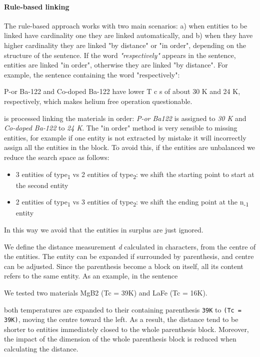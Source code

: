\documentclass{article}
\begin{document}
\paragraph{Rule-based linking}
The rule-based approach works with two main scenarios: a) when entities to be linked have cardinality one they are linked automatically, and b) when they have higher cardinality they are linked "by distance" or "in order", depending on the structure of the sentence. 
If the word \textit{"respectively"} appears in the sentence, entities are linked "in order", otherwise they are linked "by distance". 
For example, the sentence containing the word "respectively":  
\begin{displayquote}
P-or Ba-122  and Co-doped Ba-122 have lower T c s of about 30 K and 24 K, respectively, which makes helium free operation questionable.
\end{displayquote}
is processed linking the materials in order: \textit{P-or Ba122} is assigned to \textit{30 K} and \textit{Co-doped Ba-122} to \textit{24 K}.
The "in order" method is very sensible to missing entities, for example if one entity is not extracted by mistake it will incorrectly assign all the entities in the block. To avoid this, if the entities are unbalanced we reduce the search space as follows: 
\begin{itemize}
    \item 3 entities of type\textsubscript{1} vs 2 entities of type\textsubscript{2}: we shift the starting point to start at the second entity 
    \item 2 entities of type\textsubscript{1} vs 3 entities of type\textsubscript{2}: we shift the ending point at the n\textsubscript{-1} entity
\end{itemize}
In this way we avoid that the entities in surplus are just ignored. 

We define the distance measurement \textit{d} calculated in characters, from the centre of the entities. The entity can be expanded if surrounded by parenthesis, and centre can be adjusted. Since the parenthesis become a block on itself, all its content refers to the same entity. 
As an example, in the sentence
\begin{displayquote}
We tested two materials MgB2 (Tc = 39K) and LaFe (Tc = 16K).
\end{displayquote}
both temperatures are expanded to their containing parenthesis \texttt{39K} to \texttt{(Tc = 39K)}, moving the centre toward the left. As a result, the distance tend to be shorter to entities immediately closed to the whole parenthesis block. Moreover, the impact of the dimension of the whole parenthesis block is reduced when calculating the distance. 
\end{document}
